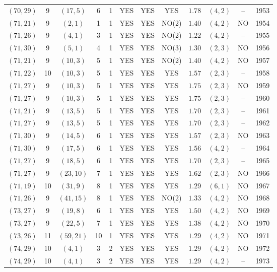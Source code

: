 \begin{longtable}{|c|c|c|c|c|c|c|c|c|c|c|c|}
$(70,29)$ & 9 & $(17,5)$ & 6 & 1 & YES & YES & YES & $1.78$ & $(4,2)$ & -- & 1953\\
$(71,21)$ & 9 & $(2,1)$ & 1 & 1 & YES & YES & NO(2) & $1.40$ & $(4,2)$ & NO & 1954\\
$(71,26)$ & 9 & $(4,1)$ & 3 & 1 & YES & YES & NO(2) & $1.22$ & $(4,2)$ & -- & 1955\\
$(71,30)$ & 9 & $(5,1)$ & 4 & 1 & YES & YES & NO(3) & $1.30$ & $(2,3)$ & NO & 1956\\
$(71,21)$ & 9 & $(10,3)$ & 5 & 1 & YES & YES & NO(2) & $1.40$ & $(4,2)$ & NO & 1957\\
$(71,22)$ & 10 & $(10,3)$ & 5 & 1 & YES & YES & YES & $1.57$ & $(2,3)$ & -- & 1958\\
$(71,27)$ & 9 & $(10,3)$ & 5 & 1 & YES & YES & YES & $1.75$ & $(2,3)$ & NO & 1959\\
$(71,27)$ & 9 & $(10,3)$ & 5 & 1 & YES & YES & YES & $1.75$ & $(2,3)$ & -- & 1960\\
$(71,21)$ & 9 & $(13,5)$ & 5 & 1 & YES & YES & YES & $1.70$ & $(2,3)$ & -- & 1961\\
$(71,27)$ & 9 & $(13,5)$ & 5 & 1 & YES & YES & YES & $1.70$ & $(2,3)$ & -- & 1962\\
$(71,30)$ & 9 & $(14,5)$ & 6 & 1 & YES & YES & YES & $1.57$ & $(2,3)$ & NO & 1963\\
$(71,30)$ & 9 & $(17,5)$ & 6 & 1 & YES & YES & YES & $1.56$ & $(4,2)$ & -- & 1964\\
$(71,27)$ & 9 & $(18,5)$ & 6 & 1 & YES & YES & YES & $1.70$ & $(2,3)$ & -- & 1965\\
$(71,27)$ & 9 & $(23,10)$ & 7 & 1 & YES & YES & YES & $1.62$ & $(2,3)$ & NO & 1966\\
$(71,19)$ & 10 & $(31,9)$ & 8 & 1 & YES & YES & YES & $1.29$ & $(6,1)$ & NO & 1967\\
$(71,26)$ & 9 & $(41,15)$ & 8 & 1 & YES & YES & NO(2) & $1.33$ & $(4,2)$ & NO & 1968\\
$(73,27)$ & 9 & $(19,8)$ & 6 & 1 & YES & YES & YES & $1.50$ & $(4,2)$ & NO & 1969\\
$(73,27)$ & 9 & $(22,5)$ & 7 & 1 & YES & YES & YES & $1.38$ & $(4,2)$ & NO & 1970\\
$(73,26)$ & 11 & $(59,21)$ & 10 & 1 & YES & YES & YES & $1.29$ & $(4,2)$ & NO & 1971\\
$(74,29)$ & 10 & $(4,1)$ & 3 & 2 & YES & YES & YES & $1.29$ & $(4,2)$ & NO & 1972\\
$(74,29)$ & 10 & $(4,1)$ & 3 & 2 & YES & YES & YES & $1.29$ & $(4,2)$ & -- & 1973\\

\end{longtable}
